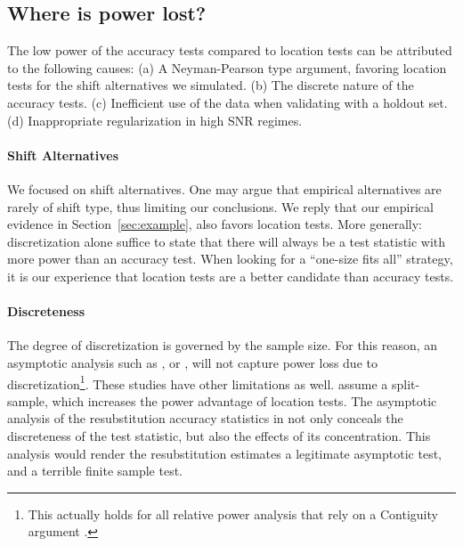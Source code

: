 \documentclass[12pt,a4paper]{article}
\begin{document}
\subsection{Where is power lost?}
The low power of the accuracy tests compared to location tests can be attributed to the following causes:\newline
(a) A Neyman-Pearson type argument, favoring location tests for the shift alternatives we simulated. \newline
(b) The discrete nature of the accuracy tests. \newline
(c) Inefficient use of the data when validating with a holdout set. \newline
(d) Inappropriate regularization in high SNR regimes. \newline



\paragraph{Shift Alternatives}
We focused on shift alternatives. 
One may argue that empirical alternatives are rarely of shift type, thus limiting our conclusions. 
We reply that our empirical evidence in Section~\ref{sec:example}, also favors location tests. 
More generally: discretization alone suffice to state that there will always be a test statistic with more power than an accuracy test. 
When looking for a ``one-size fits all'' strategy, it is our experience that location tests are a better candidate than accuracy tests. 



\paragraph{Discreteness}
The degree of discretization is governed by the sample size. 
For this reason, an asymptotic analysis such as \cite{ramdas_classification_2016}, or \cite{golland_permutation_2005}, will not capture power loss due to discretization\footnote{This actually holds for all relative power analysis that rely on a Contiguity argument \cite[Ch.6]{vaart_asymptotic_1998}.}.
These studies have other limitations as well.
\citet{ramdas_classification_2016} assume a split-sample, which increases the power advantage of location tests.
The asymptotic analysis of the resubstitution accuracy statistics in \citep{golland_permutation_2005} not only conceals the discreteness of the test statistic, but also the effects of its concentration. 
This analysis would render the resubstitution estimates a legitimate asymptotic test, and a terrible finite sample test. 
\end{document}
